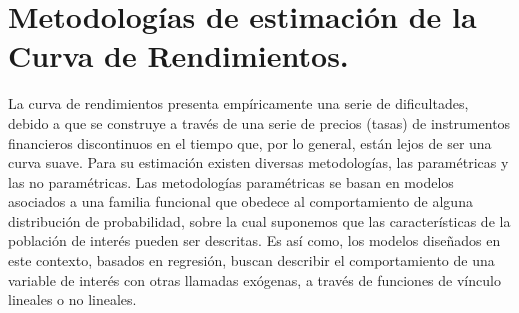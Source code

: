 % 
% 
% 
% 
% 
% 
% 
% 
% 
% 
% 
% 
% 

\section{Metodolog\'ias de estimaci\'on de la Curva de Rendimientos.}

\hspace*{0.4 cm} La curva de rendimientos presenta emp\'iricamente una serie de dificultades, debido a que se construye a trav\'es de una serie de precios (tasas) de instrumentos financieros discontinuos en el tiempo que, por lo general, est\'an lejos de ser una curva suave. Para su estimaci\'on existen diversas metodolog\'ias, las param\'etricas y las no param\'etricas. Las metodolog\'ias param\'etricas se basan en modelos asociados a una familia funcional que obedece al comportamiento de alguna distribuci\'on de probabilidad, sobre la cual suponemos que las caracter\'isticas de la poblaci\'on de inter\'es pueden ser descritas. Es as\'i como, los modelos dise\~nados en este contexto, basados en regresi\'on, buscan describir el comportamiento de una variable de inter\'es con otras llamadas ex\'ogenas, a trav\'es de funciones de v\'inculo lineales o no lineales.



